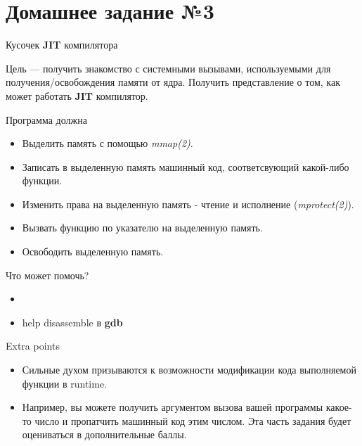 \documentclass[../../lectures.tex]{subfiles}
\begin{document}
\section{Домашнее задание №3}
Кусочек \textbf{JIT} компилятора

Цель --- получить знакомство с системными вызывами, используемыми для получения/освобождения
памяти от ядра. Получить представление о том, как может работать \textbf{JIT} компилятор.

Программа должна
\begin{itemize}
    \item Выделить память с помощью \emph{mmap(2)}.
    \item Записать в выделенную память машинный код, соответсвующий какой-либо функции.
    \item Изменить права на выделенную память - чтение и исполнение (\emph{mprotect(2)}).
    \item Вызвать функцию по указателю на выделенную память.
    \item Освободить выделенную память.
\end{itemize}

Что может помочь?
\begin{itemize}
    \item {}
    \item help disassemble в \textbf{gdb}
\end{itemize}

Extra points
\begin{itemize}
    \item Сильные духом призываются к возможности модификации кода выполняемой функции
          в runtime. 
    \item Например, вы можете получить аргументом вызова вашей программы
          какое-то число и пропатчить машинный код этим числом. Эта часть задания будет
          оцениваться в дополнительные баллы.
\end{itemize}
\end{document}

